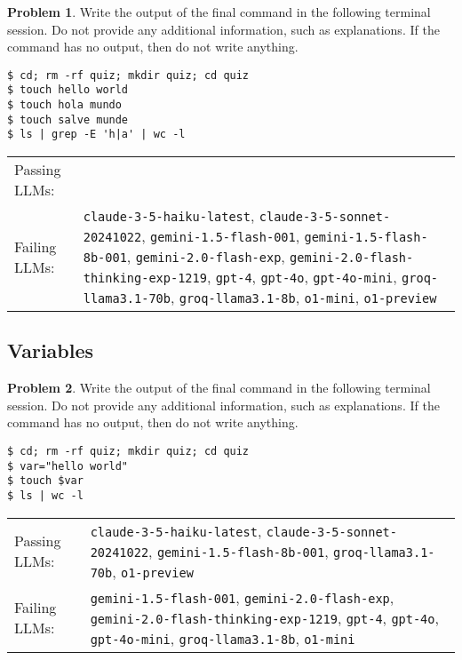 \documentclass[10pt]{article}
\theoremstyle{definition}
\newtheorem{problem}{Problem}
\begin{document}
\begin{samepage}

\begin{problem}
Write the output of the final command in the following terminal session.
Do not provide any additional information,
such as explanations.
If the command has no output,
then do not write anything.

\end{problem}
\begin{lstlisting}
$ cd; rm -rf quiz; mkdir quiz; cd quiz
$ touch hello world
$ touch hola mundo
$ touch salve munde
$ ls | grep -E 'h|a' | wc -l
\end{lstlisting}


\noindent
\begin{tabular}{p{1.0in}L{5in}}
Passing LLMs: &  \\
Failing LLMs: & {\lstinline$claude-3-5-haiku-latest$}, {\lstinline$claude-3-5-sonnet-20241022$}, {\lstinline$gemini-1.5-flash-001$}, {\lstinline$gemini-1.5-flash-8b-001$}, {\lstinline$gemini-2.0-flash-exp$}, {\lstinline$gemini-2.0-flash-thinking-exp-1219$}, {\lstinline$gpt-4$}, {\lstinline$gpt-4o$}, {\lstinline$gpt-4o-mini$}, {\lstinline$groq-llama3.1-70b$}, {\lstinline$groq-llama3.1-8b$}, {\lstinline$o1-mini$}, {\lstinline$o1-preview$} \\
\end{tabular}

\end{samepage}
\begin{samepage}
\section{Variables}

\begin{problem}
Write the output of the final command in the following terminal session.
Do not provide any additional information,
such as explanations.
If the command has no output,
then do not write anything.

\end{problem}
\begin{lstlisting}
$ cd; rm -rf quiz; mkdir quiz; cd quiz
$ var="hello world"
$ touch $var
$ ls | wc -l
\end{lstlisting}


\noindent
\begin{tabular}{p{1.0in}L{5in}}
Passing LLMs: & {\lstinline$claude-3-5-haiku-latest$}, {\lstinline$claude-3-5-sonnet-20241022$}, {\lstinline$gemini-1.5-flash-8b-001$}, {\lstinline$groq-llama3.1-70b$}, {\lstinline$o1-preview$} \\
Failing LLMs: & {\lstinline$gemini-1.5-flash-001$}, {\lstinline$gemini-2.0-flash-exp$}, {\lstinline$gemini-2.0-flash-thinking-exp-1219$}, {\lstinline$gpt-4$}, {\lstinline$gpt-4o$}, {\lstinline$gpt-4o-mini$}, {\lstinline$groq-llama3.1-8b$}, {\lstinline$o1-mini$} \\
\end{tabular}

\end{samepage}
\end{document}
